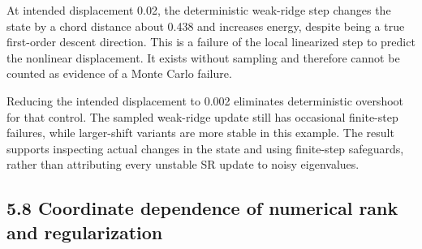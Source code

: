 \documentclass[
  11pt,
  a4paper,
]{article}
\begin{document}
At intended displacement 0.02, the deterministic weak-ridge step changes
the state by a chord distance about 0.438 and increases energy, despite
being a true first-order descent direction. This is a failure of the
local linearized step to predict the nonlinear displacement. It exists
without sampling and therefore cannot be counted as evidence of a Monte
Carlo failure.

Reducing the intended displacement to 0.002 eliminates deterministic
overshoot for that control. The sampled weak-ridge update still has
occasional finite-step failures, while larger-shift variants are more
stable in this example. The result supports inspecting actual changes in
the state and using finite-step safeguards, rather than attributing
every unstable SR update to noisy eigenvalues.

\hypertarget{coordinate-dependence-of-numerical-rank-and-regularization}{%
\subsection{5.8 Coordinate dependence of numerical rank and
regularization}\label{coordinate-dependence-of-numerical-rank-and-regularization}}
\end{document}
